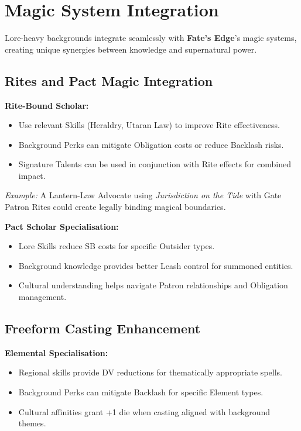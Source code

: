 \section{Magic System Integration}\label{sec:magic_integration}

Lore-heavy backgrounds integrate seamlessly with \textbf{Fate's Edge}'s magic systems, creating unique synergies between knowledge and supernatural power.

\subsection{Rites and Pact Magic Integration}\label{subsec:rites_integration}

\textbf{Rite-Bound Scholar:}
\begin{itemize}
    \item Use relevant Skills (Heraldry, Utaran Law) to improve Rite effectiveness.
    \item Background Perks can mitigate Obligation costs or reduce Backlash risks.
    \item Signature Talents can be used in conjunction with Rite effects for combined impact.
\end{itemize}
\textit{Example:} A Lantern-Law Advocate using \emph{Jurisdiction on the Tide} with Gate Patron Rites could create legally binding magical boundaries.

\textbf{Pact Scholar Specialisation:}
\begin{itemize}
    \item Lore Skills reduce SB costs for specific Outsider types.
    \item Background knowledge provides better Leash control for summoned entities.
    \item Cultural understanding helps navigate Patron relationships and Obligation management.
\end{itemize}

\subsection{Freeform Casting Enhancement}\label{subsec:casting_enhancement}

\textbf{Elemental Specialisation:}
\begin{itemize}
    \item Regional skills provide DV reductions for thematically appropriate spells.
    \item Background Perks can mitigate Backlash for specific Element types.
    \item Cultural affinities grant +1 die when casting aligned with background themes.
\end{itemize}

